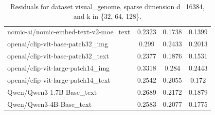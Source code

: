 \begin{table}[ht]
\begin{tabular}{lccc}
nomic-ai/nomic-embed-text-v2-moe\_text & 0.2323 & 0.1738 & 0.1399 \\
openai/clip-vit-base-patch32\_img & 0.299 & 0.2433 & 0.2013 \\
openai/clip-vit-base-patch32\_text & 0.2377 & 0.1876 & 0.1531 \\
openai/clip-vit-large-patch14\_img & 0.3318 & 0.284 & 0.2443 \\
openai/clip-vit-large-patch14\_text & 0.2542 & 0.2055 & 0.172 \\
Qwen/Qwen3-1.7B-Base\_text & 0.2689 & 0.2172 & 0.1879 \\
Qwen/Qwen3-4B-Base\_text & 0.2583 & 0.2077 & 0.1775 \\
\hline
\end{tabular}
\caption{Residuals for dataset visual\_genome, sparse dimension d=16384, and k in \{32, 64, 128\}.}
\label{tab:residuals_visual_genome_d_16384}
\end{table}
